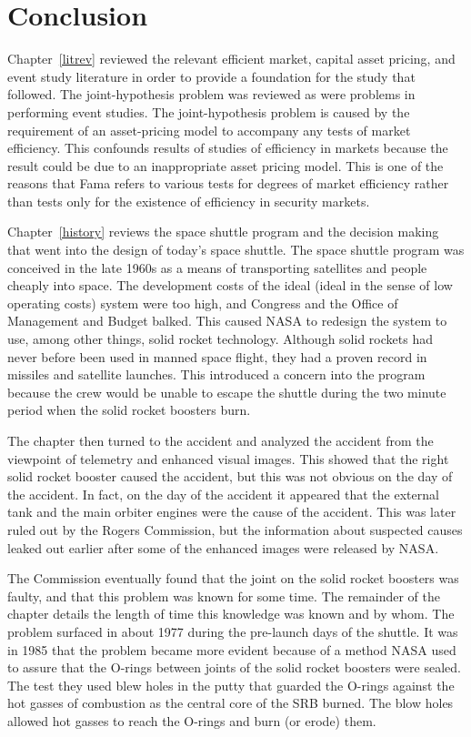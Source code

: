 \chapter{Conclusion}

Chapter~\ref{litrev} reviewed the relevant efficient market, capital asset pricing, and event study literature in order to provide a foundation for the study that followed. The joint-hypothesis problem was reviewed as were problems in performing event studies. The joint-hypothesis problem is caused by the requirement of an asset-pricing model to accompany any tests of market efficiency. This confounds results of studies of efficiency in markets because the result could be due to an inappropriate asset pricing model. This is one of the reasons that Fama refers to various tests for degrees of market efficiency rather than tests only for the existence of efficiency in security markets.

Chapter~\ref{history} reviews the space shuttle program and the decision making that went into the design of today's space shuttle. The space shuttle program was conceived in the late 1960s as a means of transporting satellites and people cheaply into space. The development costs of the ideal (ideal in the sense of low operating costs) system were too high, and Congress and the Office of Management and Budget balked. This caused NASA to redesign the system to use, among other things, solid rocket technology. Although solid rockets had never before been used in manned space flight, they had a proven record in missiles and satellite launches. This introduced a concern into the program because the crew would be unable to escape the shuttle during the two minute period when the solid rocket boosters burn.

The chapter then turned to the accident and analyzed the accident from the viewpoint of telemetry and enhanced visual images. This showed that the right solid rocket booster caused the accident, but this was not obvious on the day of the accident. In fact, on the day of the accident it appeared that the external tank and the main orbiter engines were the cause of the accident. This was later ruled out by the Rogers Commission, but the information about suspected causes leaked out earlier after some of the enhanced images were released by NASA.

The Commission eventually found that the joint on the solid rocket boosters was faulty, and that this problem was known for some time. The remainder of the chapter details the length of time this knowledge was known and by whom. The problem surfaced in about 1977 during the pre-launch days of the shuttle. It was in 1985 that the problem became more evident because of a method NASA used to assure that the O-rings between joints of the solid rocket boosters were sealed. The test they used blew holes in the putty that guarded the O-rings against the hot gasses of combustion as the central core of the SRB burned. The blow holes allowed hot gasses to reach the O-rings and burn (or erode) them.


